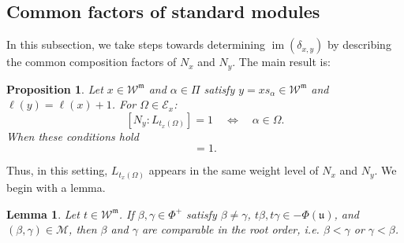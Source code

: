 \documentclass[12pt]{amsart}
\newtheorem{lemma}[theorem]{Lemma}
\newtheorem{prop}[theorem]{Proposition}
\theoremstyle{definition}
\numberwithin{equation}{section}
\newcommand{\m}{\mathfrak m}
\newcommand{\W}{\mathscr W}
\begin{document}
\subsection{Common factors of standard modules} In this subsection, we take steps towards determining $\operatorname{im}(\delta_{x,y})$ by describing the common composition factors of $N_x$ and $N_y$. The main result is:

\begin{prop}\label{prop:am-common}
Let $x\in\W^{\m}$ and $\alpha\in\Pi$ satisfy
$y=xs_\alpha\in\W^{\m}$ and $\ell(y)=\ell(x)+1$.
For $\Omega\in\mathscr E_x$:
\begin{equation}\label{eq:am-common}
[N_y:L_{t_x(\Omega)}]=1\quad\Longleftrightarrow\quad\alpha\in\Omega.
\end{equation}
When these conditions hold
\begin{equation}
[\operatorname{Gr}^{W}_{d_X+\ell(x)+|\Omega_x^+|}N_y:L_{t_x(\Omega)}]=1.    
\end{equation}
\end{prop}

\noindent Thus, in this setting, $L_{t_x(\Omega)}$ appears in the same weight level of $N_x$ and $N_y$. We begin with a lemma.

\begin{lemma}\label{lem:comp}
Let $t\in\W^{\m}$. If $\beta,\gamma\in \Phi^+$ satisfy $\beta\neq \gamma$, $t\beta,t\gamma\in-\Phi(\mathfrak{u})$, and
$(\beta,\gamma)\in\mathscr M$, then $\beta$ and $\gamma$ are
comparable in the root order, i.e. $\beta<\gamma$ or $\gamma<\beta$. 
\end{lemma}
\end{document}
